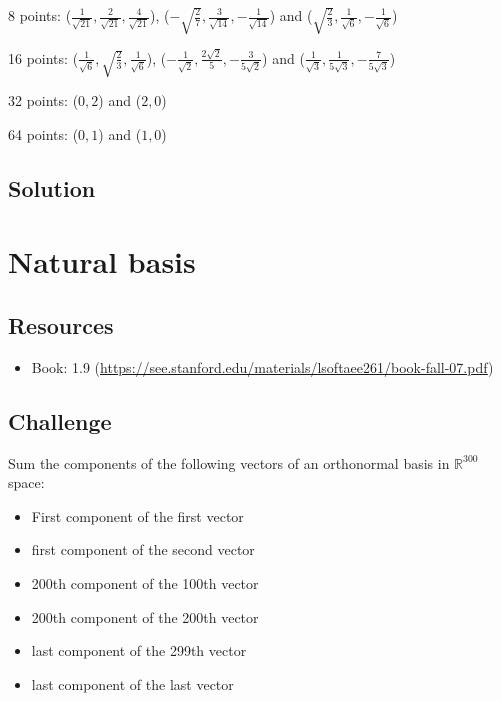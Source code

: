 8 points:
($\displaystyle \frac{1}{\sqrt{21}}, \frac{2}{\sqrt{21}}, \frac{4}{\sqrt{21}}$),
($\displaystyle -\sqrt{\frac{2}{7}}, \frac{3}{\sqrt{14}}, -\frac{1}{\sqrt{14}}$) and
($\displaystyle \sqrt{\frac{2}{3}},  \frac{1}{\sqrt{6}}, -\frac{1}{\sqrt{6}}$)

16 points:
($\displaystyle \frac{1}{\sqrt{6}}, \sqrt{\frac{2}{3}}, \frac{1}{\sqrt{6}}$),
($\displaystyle -\frac{1}{\sqrt{2}},  \frac{2 \sqrt{2}}{5}, -\frac{3}{5 \sqrt{2}}$) and
($\displaystyle \frac{1}{\sqrt{3}},  \frac{1}{5 \sqrt{3}}, -\frac{7}{5 \sqrt{3}}$)

32 points:
($0, 2$) and ($2, 0$)

64 points:
($0, 1$) and ($1, 0$)

\subsection*{Solution}




\newpage
\section{Natural basis}

\subsection*{Resources}
\begin{itemize}
    \item Book: 1.9 (\url{https://see.stanford.edu/materials/lsoftaee261/book-fall-07.pdf})
\end{itemize}

\subsection*{Challenge}
Sum the components of the following vectors of an orthonormal basis in $\mathbb{R}^{300}$ space:

\begin{itemize}
    \item First component of the first vector
    \item first component of the second vector
    \item 200th component of the 100th vector
    \item 200th component of the 200th vector
    \item last component of the 299th vector
    \item last component of the last vector
\end{itemize}

